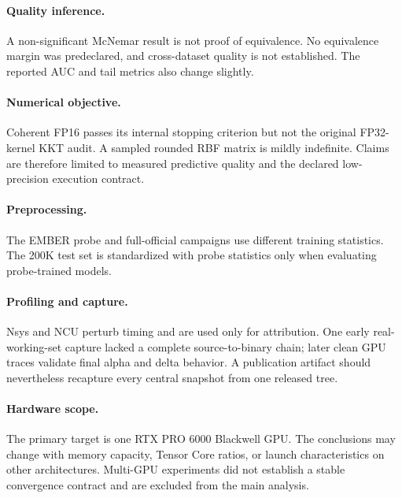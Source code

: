 \paragraph{Quality inference.}
A non-significant McNemar result is not proof of equivalence. No equivalence
margin was predeclared, and cross-dataset quality is not established. The
reported AUC and tail metrics also change slightly.

\paragraph{Numerical objective.}
Coherent FP16 passes its internal stopping criterion but not the original
FP32-kernel KKT audit. A sampled rounded RBF matrix is mildly indefinite.
Claims are therefore limited to measured predictive quality and the declared
low-precision execution contract.

\paragraph{Preprocessing.}
The EMBER probe and full-official campaigns use different training statistics.
The 200K test set is standardized with probe statistics only when evaluating
probe-trained models.

\paragraph{Profiling and capture.}
Nsys and NCU perturb timing and are used only for attribution. One early
real-working-set capture lacked a complete source-to-binary chain; later clean
GPU traces validate final alpha and delta behavior. A publication artifact
should nevertheless recapture every central snapshot from one released tree.

\paragraph{Hardware scope.}
The primary target is one RTX PRO 6000 Blackwell GPU. The conclusions may
change with memory capacity, Tensor Core ratios, or launch characteristics on
other architectures. Multi-GPU experiments did not establish a stable
convergence contract and are excluded from the main analysis.
